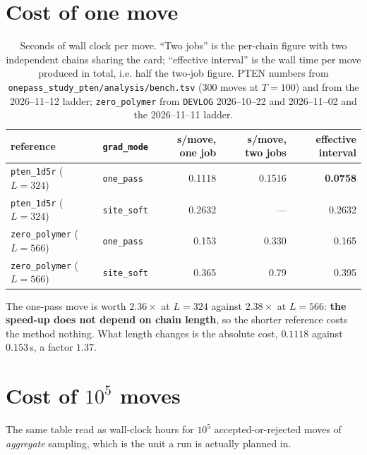 \documentclass[11pt,a4paper]{article}
\newcommand{\file}[1]{\texttt{#1}}
\begin{document}
\section{Cost of one move}

\begin{table}[h]
\centering
\begin{tabular}{llrrr}
\toprule
reference & \texttt{grad\_mode} & s/move, one job & s/move, two jobs & effective interval \\
\midrule
\file{pten\_1d5r} ($L=324$)     & \texttt{one\_pass}  & 0.1118 & 0.1516 & \textbf{0.0758} \\
\file{pten\_1d5r} ($L=324$)     & \texttt{site\_soft} & 0.2632 & ---    & 0.2632 \\
\file{zero\_polymer} ($L=566$)  & \texttt{one\_pass}  & 0.153  & 0.330  & 0.165 \\
\file{zero\_polymer} ($L=566$)  & \texttt{site\_soft} & 0.365  & 0.79   & 0.395 \\
\bottomrule
\end{tabular}
\caption{Seconds of wall clock per move. ``Two jobs'' is the per-chain figure
with two independent chains sharing the card; ``effective interval'' is the
wall time per move produced in total, i.e. half the two-job figure. PTEN
numbers from \file{onepass\_study\_pten/analysis/bench.tsv} (300 moves at
$T=100$) and from the 2026--11--12 ladder; \file{zero\_polymer} from
\file{DEVLOG} 2026--10--22 and 2026--11--02 and the 2026--11--11 ladder.}
\end{table}

\noindent
The one-pass move is worth $2.36\times$ at $L=324$ against $2.38\times$ at
$L=566$: \textbf{the speed-up does not depend on chain length}, so the shorter
reference costs the method nothing. What length changes is the absolute cost,
$0.1118$ against $0.153$\,s, a factor $1.37$.

\section{Cost of \texorpdfstring{$10^5$}{1e5} moves}

The same table read as wall-clock hours for $10^5$ accepted-or-rejected moves
of \emph{aggregate} sampling, which is the unit a run is actually planned in.
\end{document}
